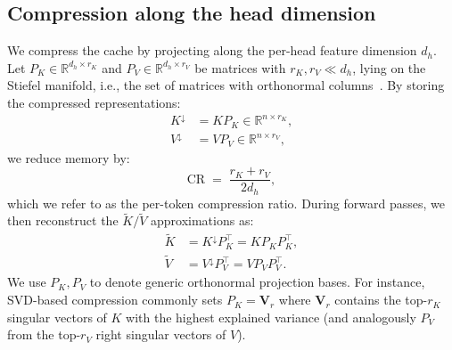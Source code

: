  
\subsection{Compression along the head dimension}
We compress the cache by projecting along the per-head feature dimension $d_h$.
Let $P_K \in \mathbb{R}^{d_h \times r_K}$ and $P_V \in \mathbb{R}^{d_h \times r_V}$ be matrices with $r_K,r_V \ll d_h$, lying on the Stiefel manifold, i.e., the set of matrices with orthonormal columns~\cite{stella}.
By storing the compressed representations:
\begin{equation}
\begin{aligned}
K^{\downarrow} &= K P_K \in \mathbb{R}^{n \times r_K},\\
V^{\downarrow} &= V P_V \in \mathbb{R}^{n \times r_V},
\end{aligned}
\label{eq:bg_compress}
\end{equation}
we reduce memory by:
\begin{equation}
\mathrm{CR} \;=\; \frac{r_K + r_V}{2d_h},
\label{eq:bg_cr}
\end{equation}
which we refer to as the per-token compression ratio.
During forward passes, we then reconstruct the $\tilde{K}/\tilde{V}$ approximations as:
\begin{equation}
\begin{aligned}
\tilde{K} &= K^{\downarrow}P_K^\top = K P_K P_K^\top,\\
\tilde{V} &= V^{\downarrow}P_V^\top = V P_V P_V^\top.
\end{aligned}
\label{eq:bg_reconstruct}
\end{equation}
We use $P_K,P_V$ to denote generic orthonormal projection bases.
For instance, SVD-based compression commonly sets $P_K=\mathbf{V}_r$ where $\mathbf{V}_r$ contains the top-$r_K$ singular vectors of $K$ with the highest explained variance (and analogously $P_V$ from the top-$r_V$ right singular vectors of $V$).




